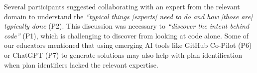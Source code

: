 Several participants suggested collaborating with an expert from the relevant domain to understand the \textit{``typical things [experts] need to do and how [those are] typically done} (P2). This discussion was necessary to \textit{``discover the intent behind code''} (P1), which is challenging to discover from looking at code alone. Some of our educators mentioned that using emerging AI tools like GitHub Co-Pilot (P6) or ChatGPT (P7) to generate solutions may also help with plan identification when plan identifiers lacked the relevant expertise.








